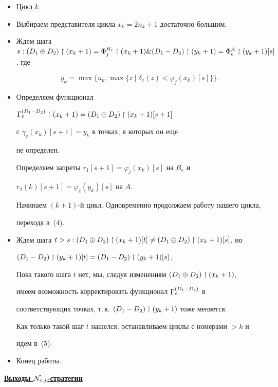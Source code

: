 \begin{itemize}


\item[] \underline{Цикл $k$}


\item[(1)] Выбираем представителя цикла $x_k=2n_k+1$ достаточно большим.


\item[(2)] Ждем шага $s: \dsum\rst(x_k+1)=\Phi_j^{B_e}\rst(x_k+1)\&


\draz\rst(y_k+1)=\Phi_e^A\rst(y_k+1) [s]$, где


$$


y_k=\max\{n_k,\max\{z\mid\delta_e(z)<\varphi_j(x_k)[s]\}\}.


$$


\item[(3)] Определяем функционал


$\Gamma_e^{\draz}\rst(x_k+1)=\dsum\rst(x_k+1)[s+1]$


с $\gamma_e(x_k)[s+1]=y_k$ в точках, в которых он еще


не определен.


Определяем запреты $r_1[s+1]=\varphi_j(x_k)[s]$ на $B_e$ и


$r_2(k)[s+1]=\varphi_e(y_k)[s]$ на $A$.


Начинаем $(k+1)$-й цикл. Одновременно продолжаем работу нашего цикла,


переходя в~(4).


\item[(4)] Ждем шага $t>s:(D_1\oplus D_2)\upharpoonright(x_k+1)[t]\neq(D_1\oplus D_2)\upharpoonright(x_k+1)[s]$, но


$\draz\rst(y_k+1)[t]=\draz\rst(y_k+1)[s]$.


Пока такого шага $t$ нет, мы, следуя изменениям $(D_1\oplus D_2)\upharpoonright(x_k+1)$,


имеем возможность корректировать функционал $\Gamma_e^{\draz}$ в


соответствующих точках, т.\,к. $\draz\rst(y_k+1)$ тоже меняется.


Как только такой шаг $t$ нашелся, останавливаем циклы с номерами $>k$ и


идем в~(5).


\item[(5)] Конец работы.


\end{itemize}





\underline{\bf Выходы ${\cal N}_{e,j}$-стратегии}






